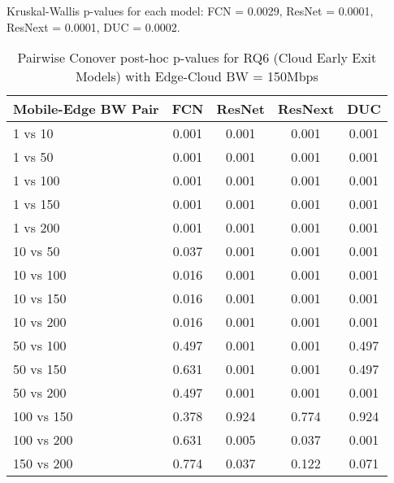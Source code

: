 \begin{table}[h]
\centering
\caption{Pairwise Conover post-hoc p-values for RQ6 (Cloud Early Exit Models) with Edge-Cloud BW = 150Mbps}
\label{tab:conover_cloud_earlyexit_ec150}
\smallskip
Kruskal-Wallis p-values for each model: FCN = 0.0029, ResNet = 0.0001, ResNext = 0.0001, DUC = 0.0002.

\begin{tabular}{lcccc}
\toprule
Mobile-Edge BW Pair & FCN & ResNet & ResNext & DUC \\
\midrule
1 vs 10 & 0.001 & 0.001 & 0.001 & 0.001 \\
1 vs 50 & 0.001 & 0.001 & 0.001 & 0.001 \\
1 vs 100 & 0.001 & 0.001 & 0.001 & 0.001 \\
1 vs 150 & 0.001 & 0.001 & 0.001 & 0.001 \\
1 vs 200 & 0.001 & 0.001 & 0.001 & 0.001 \\
10 vs 50 & 0.037 & 0.001 & 0.001 & 0.001 \\
10 vs 100 & 0.016 & 0.001 & 0.001 & 0.001 \\
10 vs 150 & 0.016 & 0.001 & 0.001 & 0.001 \\
10 vs 200 & 0.016 & 0.001 & 0.001 & 0.001 \\
50 vs 100 & 0.497 & 0.001 & 0.001 & 0.497 \\
50 vs 150 & 0.631 & 0.001 & 0.001 & 0.497 \\
50 vs 200 & 0.497 & 0.001 & 0.001 & 0.001 \\
100 vs 150 & 0.378 & 0.924 & 0.774 & 0.924 \\
100 vs 200 & 0.631 & 0.005 & 0.037 & 0.001 \\
150 vs 200 & 0.774 & 0.037 & 0.122 & 0.071 \\
\bottomrule
\end{tabular}
\end{table}


